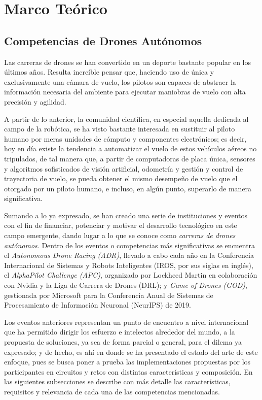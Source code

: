 \chapter{Marco Teórico}

\section{Competencias de Drones Autónomos}

Las carreras de drones se han convertido en un deporte bastante popular en los últimos años. Resulta increíble pensar que, haciendo uso de única y exclusivamente una cámara de vuelo, los pilotos son capaces de abstraer la información necesaria del ambiente para ejecutar maniobras de vuelo con alta precisión y agilidad. 

A partir de lo anterior, la comunidad científica, en especial aquella dedicada al campo de la robótica, se ha visto bastante interesada en sustituir al piloto humano por meras unidades de cómputo y componentes electrónicos; es decir, hoy en día existe la tendencia a automatizar el vuelo de estos vehículos aéreos no tripulados,  de tal manera que, a partir de computadoras de placa única, sensores y algoritmos sofisticados de visión artificial, odometría y gestión y control de trayectoria de vuelo, se pueda obtener el mismo desempeño de vuelo que el otorgado por un piloto humano, e incluso, en algún punto, superarlo de manera significativa.

Sumando a lo ya expresado, se han creado una serie de instituciones y eventos con el fin de financiar, potenciar y motivar el desarrollo tecnológico en este campo emergente, dando lugar a lo que se conoce como \textit{carreras de drones autónomos}. Dentro de los eventos o competencias más significativas se encuentra el \textit{Autonomous Drone Racing (ADR)}\cite{moon2017iros}, llevado a cabo cada año en la Conferencia Internacional de Sistemas y Robots Inteligentes (IROS, por sus siglas en inglés),  el \textit{AlphaPilot Challenge (APC)}\cite{foehn2020alphapilot}, organizado por Lockheed Martin en colaboración con Nvidia y la Liga de Carrera de Drones (DRL); y \textit{Game of Drones (GOD)}\cite{madaan2020airsim}, gestionada por Microsoft para la Conferencia Anual de Sistemas de Procesamiento de Información Neuronal (NeurIPS) de 2019.

Los eventos anteriores representan un punto de encuentro a nivel internacional que ha permitido dirigir los esfuerzo e intelectos alrededor del mundo, a la propuesta de soluciones, ya sea de forma parcial o general, para el dilema ya expresado; y de hecho, es ahí en donde se ha presentado el estado del arte de este enfoque, pues se busca poner a prueba las implementaciones propuestas por los participantes en circuitos y retos con distintas características y composición. En las siguientes subsecciones se describe con más detalle las características, requisitos y relevancia de cada una de las competencias mencionadas.

